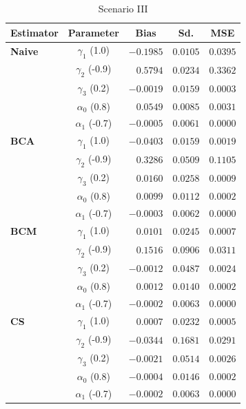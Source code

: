 \documentclass[11pt]{article}
\theoremstyle{definition}
\theoremstyle{remark}
\begin{document}
\begin{table}[ht]
\centering
\caption{Scenario III}
\begin{tabular}{l c r r r}
\hline
\hline
Estimator & Parameter & \multicolumn{1}{c}{Bias} & \multicolumn{1}{c}{Sd.} & \multicolumn{1}{c}{MSE} \\
\hline
\textbf{Naive} & $\gamma_1$ (1.0)  & $-0.1985$ & $0.0105$ & $0.0395$ \\
               & $\gamma_2$ (-0.9) & $0.5794$  & $0.0234$ & $0.3362$ \\
               & $\gamma_3$ (0.2)  & $-0.0019$ & $0.0159$ & $0.0003$ \\
               & $\alpha_0$ (0.8)  & $0.0549$  & $0.0085$ & $0.0031$ \\
               & $\alpha_1$ (-0.7) & $-0.0005$ & $0.0061$ & $0.0000$ \\
\hline
\textbf{BCA}   & $\gamma_1$ (1.0)  & $-0.0403$ & $0.0159$ & $0.0019$ \\
               & $\gamma_2$ (-0.9) & $0.3286$  & $0.0509$ & $0.1105$ \\
               & $\gamma_3$ (0.2)  & $0.0160$  & $0.0258$ & $0.0009$ \\
               & $\alpha_0$ (0.8)  & $0.0099$  & $0.0112$ & $0.0002$ \\
               & $\alpha_1$ (-0.7) & $-0.0003$ & $0.0062$ & $0.0000$ \\
\hline
\textbf{BCM}   & $\gamma_1$ (1.0)  & $0.0101$  & $0.0245$ & $0.0007$ \\
               & $\gamma_2$ (-0.9) & $0.1516$  & $0.0906$ & $0.0311$ \\
               & $\gamma_3$ (0.2)  & $-0.0012$ & $0.0487$ & $0.0024$ \\
               & $\alpha_0$ (0.8)  & $0.0012$  & $0.0140$ & $0.0002$ \\
               & $\alpha_1$ (-0.7) & $-0.0002$ & $0.0063$ & $0.0000$ \\
\hline
\textbf{CS}    & $\gamma_1$ (1.0)  & $0.0007$  & $0.0232$ & $0.0005$ \\
               & $\gamma_2$ (-0.9) & $-0.0344$ & $0.1681$ & $0.0291$ \\
               & $\gamma_3$ (0.2)  & $-0.0021$ & $0.0514$ & $0.0026$ \\
               & $\alpha_0$ (0.8)  & $-0.0004$ & $0.0146$ & $0.0002$ \\
               & $\alpha_1$ (-0.7) & $-0.0002$ & $0.0063$ & $0.0000$ \\
\hline
\hline
\end{tabular}
\end{table}
\end{document}
